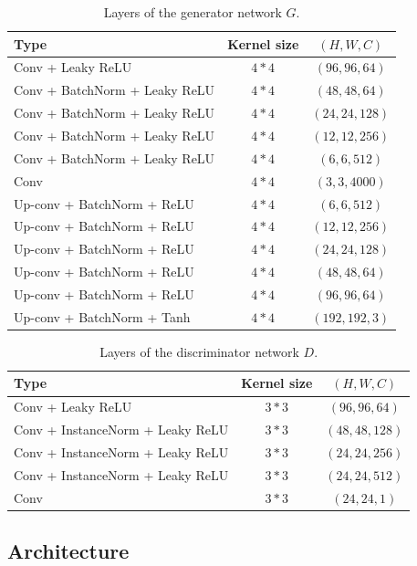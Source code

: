 \documentclass[twocolumn,showpacs,%
  nofootinbib,aps,superscriptaddress,%
  eqsecnum,prd,notitlepage,showkeys,10pt]{revtex4-1}
\begin{document}
\begin{table}[tp]
\centering
\footnotesize
\begin{tabular}{l c c}
  \hline
  Type & Kernel size & $(H,W,C)$ \\ \hline\hline
  Conv + Leaky ReLU & $4 * 4$ & $(96, 96, 64)$ \\
  Conv + BatchNorm + Leaky ReLU & $4 * 4$ & $(48, 48, 64)$ \\
  Conv + BatchNorm + Leaky ReLU & $4 * 4$ & $(24, 24, 128)$ \\
  Conv + BatchNorm + Leaky ReLU & $4 * 4$ & $(12, 12, 256)$ \\
  Conv + BatchNorm + Leaky ReLU & $4 * 4$ & $(6, 6, 512)$ \\
  Conv & $4 * 4$ & $(3, 3, 4000)$ \\
  Up-conv + BatchNorm + ReLU & $4 * 4$ & $(6, 6, 512)$ \\
  Up-conv + BatchNorm + ReLU & $4 * 4$ & $(12, 12, 256)$ \\
  Up-conv + BatchNorm + ReLU & $4 * 4$ & $(24, 24, 128)$ \\
  Up-conv + BatchNorm + ReLU & $4 * 4$ & $(48, 48, 64)$ \\
  Up-conv + BatchNorm + ReLU & $4 * 4$ & $(96, 96, 64)$ \\
  Up-conv + BatchNorm + Tanh & $4 * 4$ & $(192, 192, 3)$ \\ \hline
\end{tabular}
\caption{Layers of the generator network $G$.}
\label{tab:layers_G}
\end{table}

\begin{table}[tp]
\centering
\footnotesize
\begin{tabular}{l c c}
  \hline
  Type & Kernel size & $(H,W,C)$ \\ \hline\hline
  Conv + Leaky ReLU & $3 * 3$ & $(96, 96, 64)$ \\
  Conv + InstanceNorm + Leaky ReLU & $3 * 3$ & $(48, 48, 128)$ \\
  Conv + InstanceNorm + Leaky ReLU & $3 * 3$ & $(24, 24, 256)$ \\
  Conv + InstanceNorm + Leaky ReLU & $3 * 3$ & $(24, 24, 512)$ \\
  Conv & $3 * 3$ & $(24, 24, 1)$ \\ \hline
\end{tabular}
\caption{Layers of the discriminator network $D$.}
\label{tab:layers_D}
\end{table}

\subsection{Architecture}
\end{document}

